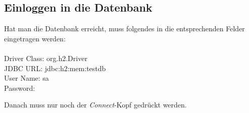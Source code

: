 \documentclass[a4paper]{report}
\newenvironment{code}{\ttfamily}{\par}
\begin{document}
\subsection{Einloggen in die Datenbank}
Hat man die Datenbank erreicht, muss folgendes in die entsprechenden Felder eingetragen werden:\\
\\
\begin{code}
	Driver Class: org.h2.Driver\\
	JDBC URL: jdbc:h2:mem:testdb\\
	User Name: sa\\
	Password: \\
\end{code}
\noindent
Danach muss nur noch der \textit{Connect}-Kopf gedrückt werden.
\end{document}

